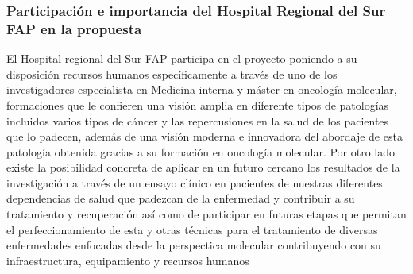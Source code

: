 \documentclass[a4paper,11pt]{article}
\begin{document}
\subsubsection{Participación e importancia del Hospital Regional del Sur FAP en la propuesta} 
El Hospital regional del Sur FAP participa en el proyecto poniendo a su disposición recursos humanos específicamente a través  de uno de los investigadores especialista  en Medicina interna  y máster en oncología molecular, formaciones que le confieren una visión amplia en diferente tipos de patologías incluidos varios tipos de cáncer y las repercusiones en la salud de los pacientes que lo padecen,  además de una visión moderna e innovadora del abordaje de esta patología obtenida gracias a su formación en oncología molecular. 
Por otro lado existe la posibilidad concreta de aplicar en un futuro cercano los resultados de la investigación a través de un ensayo clínico en pacientes de nuestras diferentes dependencias de salud que padezcan de la enfermedad y contribuir a su tratamiento y recuperación así como de participar en futuras etapas que permitan el perfeccionamiento de esta y otras técnicas para el tratamiento de diversas enfermedades enfocadas desde la perspectica molecular contribuyendo con su infraestructura, equipamiento y recursos humanos 

\clearpage


%



	
\end{document}
